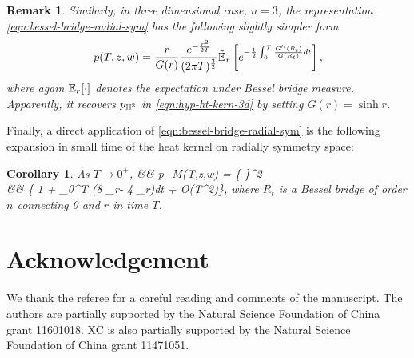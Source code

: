 \documentclass[12pt, reqno]{amsart}
\numberwithin{equation}{section}
\newtheorem{remark}{Remark}
\newtheorem{cor}{Corollary}
\begin{document}
\begin{remark}
Similarly, in three dimensional case, $n=3$, the representation \eqref{eqn:bessel-bridge-radial-sym} has the following slightly simpler form
\[
p(T,z,w)
= \frac{r}{G(r)} \frac{e^{-\frac{r^2}{2T}}}{(2\pi T)^{\frac 32}} \tilde{\mathbb{E}}_{r} \left[ e^{-\frac12 \int_0^T  \frac{G''(R_t)}{G(R_t)} dt} \right],
\]
where again $\mathbb{E}_r[\cdot]$ denotes the expectation under Bessel bridge measure. Apparently, it recovers $p_{\mathbb{H}^3}$ in \eqref{eqn:hyp-ht-kern-3d} by setting $G(r) = \sinh r$. 
\end{remark}
Finally, a direct application of \eqref{eqn:bessel-bridge-radial-sym} is the following expansion in small time of the heat kernel on radially symmetry space:
\begin{cor}
As $T \to 0^+$,
\beaa
&& p_M(T,z,w) = \left\{ \right\}^{2}  \times \\
&& \quad \left\{ 1 + \int_0^T \left(8 \E_r - 4 \E_r \right)dt + O(T^2)\right\},
\eeaa
where $R_t$ is a Bessel bridge of order $n$ connecting 0 and $r$ in time $T$.
\end{cor}

%
%

\section*{Acknowledgement}
We thank the referee for a careful reading and comments of the manuscript. The authors are partially supported by the Natural Science Foundation of China grant 11601018. XC is also partially supported by the Natural Science Foundation of China grant 11471051.

%
%
\end{document}
